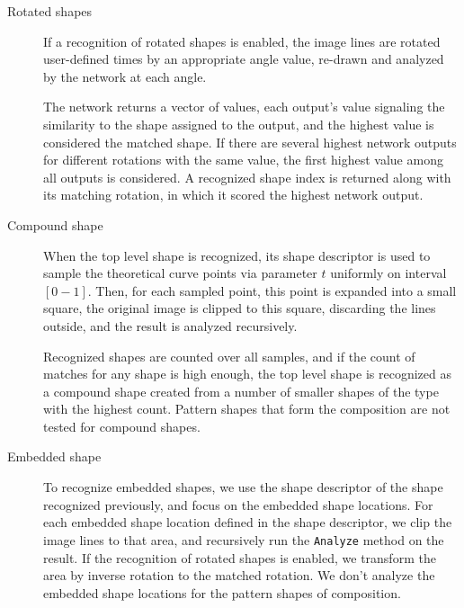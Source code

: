 \begin{description}
\item [Rotated shapes] If a recognition of rotated shapes is enabled, the image lines are rotated user-defined times by an appropriate angle value, re-drawn and analyzed by the network at each angle. 

The network returns a vector of values, each output's value signaling the similarity to the shape assigned to the output, and the highest value is considered the matched shape. If there are several highest network outputs for different rotations with the same value, the first highest value among all outputs is considered. A recognized shape index is returned along with its matching rotation, in which it scored the highest network output.

\item[Compound shape]
When the top level shape is recognized, its shape descriptor is used to sample the theoretical curve points via parameter $t$ uniformly on interval $[0-1]$. Then, for each sampled point, this point is expanded into a small square, the original image is clipped to this square, discarding the lines outside, and the result is analyzed recursively. 

Recognized shapes are counted over all samples, and if the count of matches for any shape is high enough, the top level shape is recognized as a compound shape created from a number of smaller shapes of the type with the highest count. Pattern shapes that form the composition are not tested for compound shapes.

\item [Embedded shape]
To recognize embedded shapes, we use the shape descriptor of the shape recognized previously, and focus on the embedded shape locations. For each embedded shape location defined in the shape descriptor, we clip the image lines to that area, and recursively run the \texttt{Analyze} method on the result. If the recognition of rotated shapes is enabled, we transform the area by inverse rotation to the matched rotation. We don't analyze the embedded shape locations for the pattern shapes of composition.

\end{description}

